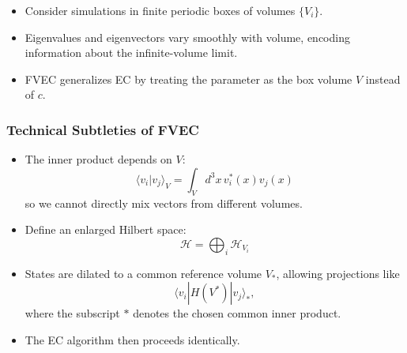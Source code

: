 \begin{itemize}
	\item Consider simulations in finite periodic boxes of volumes $\{V_i\}$.
	\item Eigenvalues and eigenvectors vary smoothly with volume, encoding information about the infinite-volume limit.
	\item FVEC generalizes EC by treating the parameter as the box volume $V$ instead of $c$.
\end{itemize}


\subsubsection{Technical Subtleties of FVEC}

\begin{itemize}
	\item The inner product depends on $V$:
	\[
	\langle v_i | v_j \rangle_V = \int_V d^3x\, v_i^*(x) v_j(x)
	\]
	so we cannot directly mix vectors from different volumes.
	\item Define an enlarged Hilbert space:
	\[
	\mathcal{H} = \bigoplus_i \mathcal{H}_{V_i}
	\]
	\item States are dilated to a common reference volume $V_*$, allowing projections like
	\[
	\langle v_i | H(V^*) | v_j \rangle_*,
	\]
	where the subscript $*$ denotes the chosen common inner product.
	\item The EC algorithm then proceeds identically.
\end{itemize}



